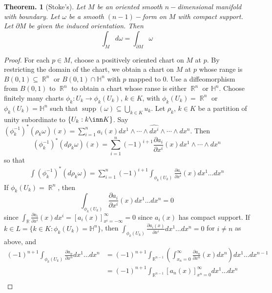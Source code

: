 \documentclass[11pt, a4paper]{memoir}
\DeclareMathOperator{\R}{{\mathbb{R}}}
\theoremstyle{change}
\newtheorem{theorem}{Theorem.}[section]
\theoremstyle{plain}
\theoremstyle{nonumberplain}
\newtheorem{proof}{Proof}
\DeclareMathOperator{\supp}{supp}
\newcommand{\prt}[2]{\ensuremath{\frac{\partial #1}{\partial #2}}}
\numberwithin{equation}{section}
\begin{document}
\begin{theorem}[Stoke's]
    Let $M$ be an oriented smooth $n-$dimensional manifold with boundary.
    Let $\omega$ be a smooth $(n-1)-$form on $M$ with compact support.
    Let $\partial M$ be given the induced orientation.
    Then
    \begin{equation*}
        \int_Md\omega=\int_{\partial M}\omega
    \end{equation*}
\end{theorem}
\begin{proof}
    For each $p\in M$, choose a positively oriented chart on $M$ at $p$.
    By restricting the domain of the chart, we obtain a chart on $M$ at $p$ whose range is $B(0,1)\subseteq\R^n$ or $B(0,1)\cap\mathbb{H}^n$ with $p$ mapped to $0$.
    Use a diffeomorphism from $B(0,1)$ to $\R^n$ to obtain a chart whose ranse is either $\R^n$ or $\mathbb{H}^n$.
    Choose finitely many charts $\phi_k:U_k\to\phi_k(U_k)$, $k\in K$, with $\phi_k(U_k)=\R^n$ or $\phi_k(U_k)=\mathbb{H}^n$ such that $\supp(\omega)\subseteq\bigcup_{k\in K}u_k$.
    Let $\rho_k$, $k\in K$ be a partition of unity subordinate to $\{U_k:k\inn K\}$.
    Say $(\phi_k^{-1})^*(\rho_k\omega)(x)=\sum_{i=1}^n a_i(x)dx^1\wedge\cdots\wedge\widehat{dx^i}\wedge\cdots\wedge dx^n$.
    Then
    \begin{equation*}
        (\phi_k^{-1})^*(d\rho_k\omega)(x)=\sum_{i=1}^n(-1)^{i+1}\prt{a_i}{x^i}(x)dx^1\wedge\cdots\wedge dx^n
    \end{equation*}
    so that
    \begin{align*}
        \int (\phi_k^{-1})^*(d\rho_k\omega)=\sum_{i=1}^n(-1)^{i+1}\int_{\phi_k(U_k)}\prt{a_i}{x^i}(x)dx^1\ldots dx^n
    \end{align*}
    If $\phi_k(U_k)=\R^n$, then
    \begin{equation*}
        \int_{\phi_k(U_k)}\prt{a_i}{x^i}(x)dx^1\ldots dx^n=0
    \end{equation*}
    since $\int_{\R}\prt{a_i}{x^i}(x)dx^i=\left[a_i(x)\right]_{x^i=-\infty}^\infty=0$ since $a_i(x)$ has compact support.
    If $k\in L=\{k\in K:\phi_k(U_k)=\mathbb{H}^n\}$, then $\int_{\phi_k(U_k)}\prt{a_i(x)}{x^i}dx^1\ldots dx^n=0$ for $i\neq n$ as above, and
    \begin{align*}
        (-1)^{n+1}\int_{\phi_k(U_k)}\prt{a_n}{x^n}dx^1\ldots dx^n &= (-1)^{n+1}\int_{\R^{n-1}}\left(\int_{x_n=0}^\infty\prt{a_n}{x^n}(x)dx^n\right)dx^1\ldots dx^{n-1}\\
                                                                  &= (-1)^{n+1}\int_{\R^{n-1}}[a_n(x)]_{x^n=0}^\infty dx^1\ldots dx^n\\

\end{align*}
\end{proof}
\end{document}
